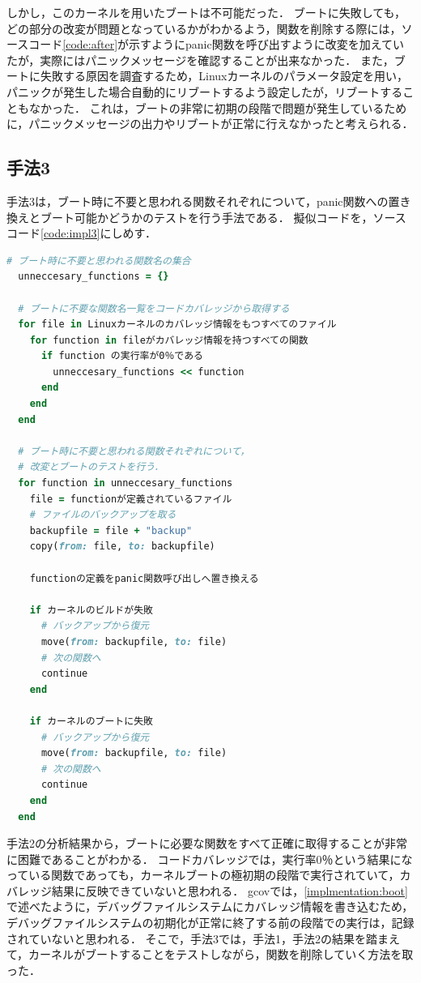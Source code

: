 \documentclass[graduation-thesis]{mlarticle}
\begin{document}
しかし，このカーネルを用いたブートは不可能だった．
ブートに失敗しても，どの部分の改変が問題となっているかがわかるよう，関数を削除する際には，ソースコード\ref{code:after}が示すようにpanic関数を呼び出すように改変を加えていたが，実際にはパニックメッセージを確認することが出来なかった．
また，ブートに失敗する原因を調査するため，Linuxカーネルのパラメータ設定を用い，パニックが発生した場合自動的にリブートするよう設定したが，リブートすることもなかった．
これは，ブートの非常に初期の段階で問題が発生しているために，パニックメッセージの出力やリブートが正常に行えなかったと考えられる．


\subsection{手法3}
\label{implementation:3}
手法3は，ブート時に不要と思われる関数それぞれについて，panic関数への置き換えとブート可能かどうかのテストを行う手法である．
擬似コードを，ソースコード\ref{code:impl3}にしめす．

\begin{lstlisting}[language=ruby, caption=手法3の擬似コード, label=code:impl3]
  # ブート時に不要と思われる関数名の集合
  unneccesary_functions = {}

  # ブートに不要な関数名一覧をコードカバレッジから取得する
  for file in Linuxカーネルのカバレッジ情報をもつすべてのファイル
    for function in fileがカバレッジ情報を持つすべての関数
      if function の実行率が0％である
        unneccesary_functions << function
      end
    end
  end

  # ブート時に不要と思われる関数それぞれについて，
  # 改変とブートのテストを行う．
  for function in unneccesary_functions
    file = functionが定義されているファイル
    # ファイルのバックアップを取る
    backupfile = file + "backup"
    copy(from: file, to: backupfile)

    functionの定義をpanic関数呼び出しへ置き換える

    if カーネルのビルドが失敗
      # バックアップから復元
      move(from: backupfile, to: file)
      # 次の関数へ
      continue
    end

    if カーネルのブートに失敗
      # バックアップから復元
      move(from: backupfile, to: file)
      # 次の関数へ
      continue
    end
  end
\end{lstlisting}

手法2の分析結果から，ブートに必要な関数をすべて正確に取得することが非常に困難であることがわかる．
コードカバレッジでは，実行率0％という結果になっている関数であっても，カーネルブートの極初期の段階で実行されていて，カバレッジ結果に反映できていないと思われる．
gcovでは，\ref{implmentation:boot}で述べたように，デバッグファイルシステムにカバレッジ情報を書き込むため，デバッグファイルシステムの初期化が正常に終了する前の段階での実行は，記録されていないと思われる．
そこで，手法3では，手法1，手法2の結果を踏まえて，カーネルがブートすることをテストしながら，関数を削除していく方法を取った．
\end{document}
